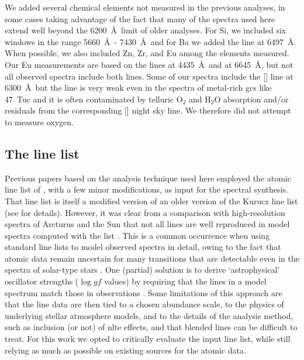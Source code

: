 \documentclass{aa}
\begin{document}
We added several chemical elements not measured in the previous analyses, in some cases taking advantage of the fact that many of the spectra used here extend well beyond the 6200~\AA\ limit of older analyses. 
For Si, we included six windows in the range 5660~\AA\ - 7430~\AA\ and for Ba we added the  line at 6497~\AA . When possible, we also included Zn, Zr, and Eu among the elements measured. 
Our Eu measurements are based on the  lines at 4435~\AA\ and at 6645~\AA, but not all observed spectra include both lines. Some of our spectra include the [] line at 6300~\AA\ but the line is very weak even in the spectra of metal-rich \acp{gc} like 47~Tuc and it is often contaminated by telluric O$_2$ and H$_2$O absorption and/or residuals from the corresponding [] night sky line. We therefore did not attempt to measure oxygen. 


\subsection{The line list}
\label{sec:linelist}

Previous papers based on the analysis technique used here employed the atomic line list of \citet[][hereafter CH2004]{Castelli2004}, with a few minor modifications, as input for the spectral synthesis. That line list is itself a modified version of an older version of the Kurucz line list (see  for details). 
However, it was clear from a comparison with high-resolution spectra of Arcturus and the Sun that not all lines are well reproduced in model spectra computed with the  list \citep{Larsen2012a}. 
This is a common occurrence when using standard line lists to model observed spectra in detail, owing to the fact that atomic data remain uncertain for many transitions that are detectable even in the spectra of solar-type stars \citep{Jofre2019}. 
One (partial) solution is to derive `astrophysical' oscillator strengths ($\log gf$ values) by requiring that the lines in a model spectrum match those in observations \citep{Shetrone2015,Boeche2016,Laverick2019}. Some limitations of this approach are that the line data are then tied to a chosen abundance scale, to the physics of underlying stellar atmosphere models, and to the details of the analysis method, such as inclusion (or not) of \ac{nlte} effects, and that blended lines can be difficult to treat. 
For this work we opted to critically evaluate the input line list, while still relying as much as possible on existing sources for the atomic data.
\end{document}
